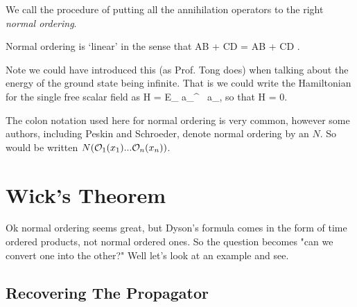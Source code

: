 We call the procedure of putting all the annihilation operators to the right \textit{normal ordering}. 


\br
    Normal ordering is `linear' in the sense that 
    \bse 
        \cl AB + CD \cl = \cl AB \cl + \cl CD \cl.
    \ese 
\er 

\br 
    Note we could have introduced this (as Prof. Tong does) when talking about the energy of the ground state being infinite. That is we could write the Hamiltonian for the single free scalar field as 
    \bse 
        \cl H \cl = \int {} E_{} a_{}^{\dagger} \, a_{},
    \ese 
    so that
    \bse 
        \cl H \cl {} = 0.
    \ese 
\er 

\bnn 
    The colon notation used here for normal ordering is very common, however some authors, including Peskin and Schroeder, denote normal ordering by an $N$. So  would be written $N(\mathcal{O}_1(x_1)...\mathcal{O}_n(x_n))$. 
\enn 

\section{Wick's Theorem}

Ok normal ordering seems great, but Dyson's formula comes in the form of time ordered products, not normal ordered ones. So the question becomes "can we convert one into the other?" Well let's look at an example and see. 

\subsection{Recovering The Propagator}

